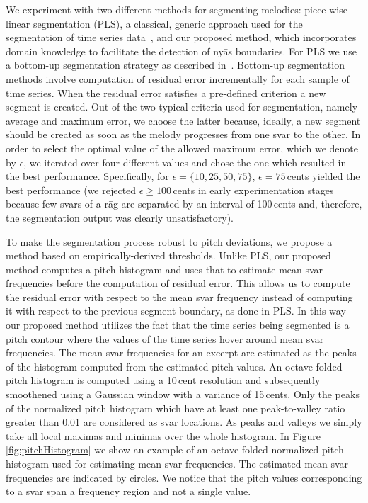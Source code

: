 {{We experiment with two different methods for segmenting melodies: piece-wise linear segmentation (PLS), a classical, generic approach used for the segmentation of time series data~\cite{keogh2004segmenting}, and our proposed method, which incorporates domain knowledge to facilitate the detection of ny\={a}s boundaries. For PLS we use a bottom-up segmentation strategy as described in~\cite{keogh2004segmenting}. Bottom-up segmentation methods involve computation of residual error incrementally for each sample of time series. When the residual error satisfies a pre-defined criterion a new segment is created. Out of the two typical criteria used for segmentation, namely average and maximum error, we choose the latter because, ideally, a new segment should be created as soon as the melody progresses from one svar to the other. In order to select the optimal value of the allowed maximum error, which we denote by $\epsilon$, we iterated over four different values and chose the one which resulted in the best performance. Specifically, for $\epsilon=\lbrace 10, 25, 50, 75\rbrace$, $\epsilon=75$\,cents yielded the best performance (we rejected $\epsilon\geq 100$\,cents in early experimentation stages because few svars of a r\={a}g are separated by an interval of 100\,cents and, therefore, the segmentation output was clearly unsatisfactory).

To make the segmentation process robust to pitch deviations, we propose a method based on empirically-derived thresholds. Unlike PLS, our proposed method computes a pitch histogram and uses that to estimate mean svar frequencies before the computation of residual error. This allows us to compute the residual error with respect to the mean svar frequency instead of computing it with respect to the previous segment boundary, as done in PLS.  In this way our proposed method utilizes the fact that the time series being segmented is a pitch contour where the values of the time series hover around mean svar frequencies. The mean svar frequencies for an excerpt are estimated as the peaks of the histogram computed from the estimated pitch values. An octave folded pitch histogram is computed using a 10\,cent resolution and subsequently smoothened using a Gaussian window with a variance of 15\,cents. Only the peaks of the normalized pitch histogram which have at least one peak-to-valley ratio greater than 0.01 are considered as svar locations. As peaks and valleys we simply take all local maximas and minimas over the whole histogram. In Figure \ref{fig:pitchHistogram} we show an example of an octave folded normalized  pitch histogram used for estimating mean svar frequencies. The estimated mean svar frequencies are indicated by circles. We notice that the pitch values corresponding to a svar span a frequency region and not a single value.

}}
